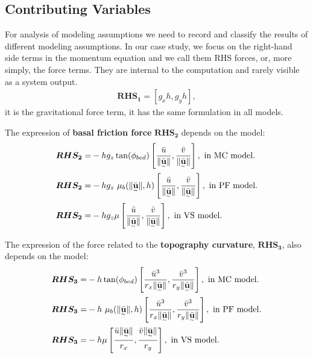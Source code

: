 \documentclass{article}
\begin{document}
\subsection{Contributing Variables}\label{sec:Fterms}
For analysis of modeling assumptions we need to record and classify the results of different modeling assumptions. In our case study, we focus on the right-hand side terms in the momentum equation and we call them RHS forces, or, more simply, the force terms. They are internal to the computation and rarely visible as a system output.
\begin{align}
\boldsymbol{RHS_1} = [g_x h,g_y h],
\end{align}
it is the gravitational force term, it has the same formulation in all models.

The expression of {\bf basal friction force} $\boldsymbol{RHS_2}$ depends on the model:
\begin{align}
\boldsymbol{RHS_2} =& -h g_z\tan(\phi_{bed})\left[\frac{\bar{u}}{\| \underset{^\sim}{\bar{\textbf u}} \|}, \frac{\bar{v}}{\| \underset{^\sim}{\bar{\textbf u}} \|} \right],\textmd{ in MC model.}\nonumber\\
\boldsymbol{RHS_2} =& - h g_z \ \mu_{b}(\|\underset{^\sim}{\bar{\textbf{u}}} \| , h)\left[\frac{\bar{u}}{\| \underset{^\sim}{\bar{\textbf{u}}} \|}, \frac{\bar{v}}{\| \underset{^\sim}{\bar{\textbf{u}}} \|}\right],\textmd{ in PF model.}\\
\boldsymbol{RHS_2} =& -h g_{z} \mu\left[\frac{\bar{u}}{\| \underset{^\sim}{\bar{\textbf u}}\|} , \frac{\bar{v}}{\| \underset{^\sim}{\bar{\textbf u}}\|}\right],\textmd{ in VS model.}\nonumber
\end{align}

The expression of the force related to the {\bf topography curvature}, $\boldsymbol{RHS_3}$, also depends on the model:
\begin{align}
\boldsymbol{RHS_3} =&-h \tan(\phi_{bed})\left[\frac{\bar{u}^3}{r_x\| \underset{^\sim}{\bar{\textbf{u}}} \|}, \frac{\bar{v}^3}{r_y\| \underset{^\sim}{\bar{\textbf{u}}} \|}\right],\textmd{ in MC model.}\nonumber\\
\boldsymbol{RHS_3} =& -h\ \mu_{b}(\|\underset{^\sim}{\bar{\textbf{u}}} \|,h)\left[\frac{\bar{u}^3}{r_x\| \underset{^\sim}{\bar{\textbf{u}}} \|}, \frac{\bar{v}^3}{r_y\| \underset{^\sim}{\bar{\textbf{u}}} \|}\right],\textmd{ in PF model.}\\
\boldsymbol{RHS_3} =& -h \mu\left[\frac{\bar{u}\| \underset{^\sim}{\bar{\textbf u}} \|}{r_{x}},\frac{\bar{v}\| \underset{^\sim}{\bar{\textbf u}} \|}{r_{y}}\right],\textmd{ in VS model.}\nonumber
\end{align}
\end{document}
